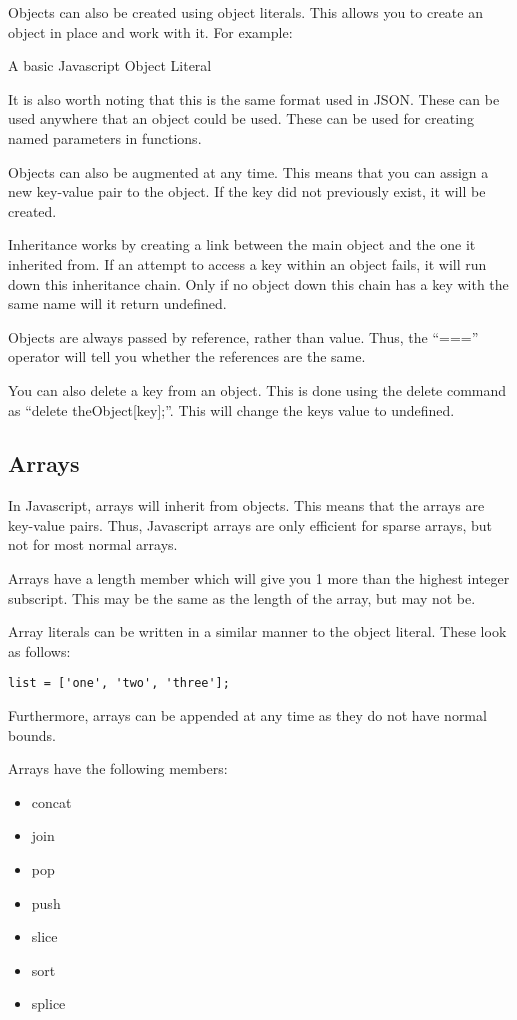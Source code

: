 			Objects can also be created using object literals. 
			This allows you to create an object in place and work with it.
			For example:
			\begin{code}
				
				\caption{A basic Javascript Object Literal}
				\label{code:JSObjectLiteral}
			\end{code}
			It is also worth noting that this is the same format used in JSON. 
			These can be used anywhere that an object could be used. 
			These can be used for creating named parameters in functions. 

			Objects can also be augmented at any time. 
			This means that you can assign a new key-value pair to the object. 
			If the key did not previously exist, it will be created. 

			Inheritance works by creating a link between the main object and the one it inherited from. 
			If an attempt to access a key within an object fails, it will run down this inheritance chain. 
			Only if no object down this chain has a key with the same name will it return undefined. 
			
			Objects are always passed by reference, rather than value. 
			Thus, the ``==='' operator will tell you whether the references are the same. 

			You can also delete a key from an object. 
			This is done using the delete command as ``delete theObject[key];''. 
			This will change the keys value to undefined. 
		\subsection{Arrays}
			In Javascript, arrays will inherit from objects. 
			This means that the arrays are key-value pairs. 
			Thus, Javascript arrays are only efficient for sparse arrays, but not for most normal arrays. 

			Arrays have a length member which will give you 1 more than the highest integer subscript. 
			This may be the same as the length of the array, but may not be. 

			Array literals can be written in a similar manner to the object literal. 
			These look as follows:
			\begin{verbatim}
list = ['one', 'two', 'three'];
			\end{verbatim}
			Furthermore, arrays can be appended at any time as they do not have normal bounds. 

			Arrays have the following members:
			\begin{itemize}
				\item concat
				\item join
				\item pop
				\item push 
				\item slice
				\item sort
				\item splice
			\end{itemize}

